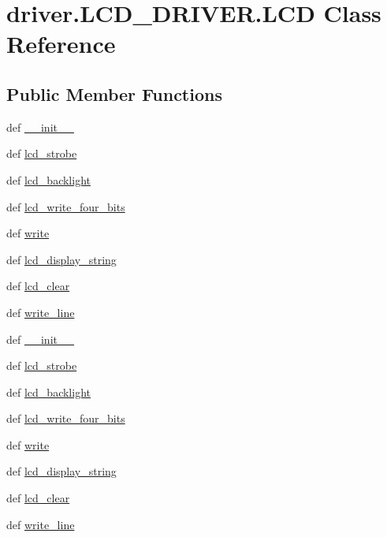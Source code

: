 \hypertarget{classdriver_1_1LCD__DRIVER_1_1LCD}{}\section{driver.\+L\+C\+D\+\_\+\+D\+R\+I\+V\+E\+R.\+L\+C\+D Class Reference}
\label{classdriver_1_1LCD__DRIVER_1_1LCD}
\subsection*{Public Member Functions}
\begin{DoxyCompactItemize}
\item 
def \hyperlink{classdriver_1_1LCD__DRIVER_1_1LCD_a20225b4d0a79ea608ab2788528735b17}{\+\_\+\+\_\+init\+\_\+\+\_\+}
\item 
def \hyperlink{classdriver_1_1LCD__DRIVER_1_1LCD_a15e214b2ce2f4e8e6e4eb46db360eb17}{lcd\+\_\+strobe}
\item 
def \hyperlink{classdriver_1_1LCD__DRIVER_1_1LCD_ac5e728a550c74f93db7aeac717f71f56}{lcd\+\_\+backlight}
\item 
def \hyperlink{classdriver_1_1LCD__DRIVER_1_1LCD_a50b4cd9441fc0869a3fc02823e1c4b50}{lcd\+\_\+write\+\_\+four\+\_\+bits}
\item 
def \hyperlink{classdriver_1_1LCD__DRIVER_1_1LCD_ad163c5a30bf46c9b7e794af4c5ee1580}{write}
\item 
def \hyperlink{classdriver_1_1LCD__DRIVER_1_1LCD_a234077a291a2a5fca1bac4e9cf6c05d0}{lcd\+\_\+display\+\_\+string}
\item 
def \hyperlink{classdriver_1_1LCD__DRIVER_1_1LCD_a6d9ced9d16566a567806e0bc2db053b4}{lcd\+\_\+clear}
\item 
def \hyperlink{classdriver_1_1LCD__DRIVER_1_1LCD_a4b8df3a45944a01d6a12b88f79d0d337}{write\+\_\+line}
\item 
def \hyperlink{classdriver_1_1LCD__DRIVER_1_1LCD_a20225b4d0a79ea608ab2788528735b17}{\+\_\+\+\_\+init\+\_\+\+\_\+}
\item 
def \hyperlink{classdriver_1_1LCD__DRIVER_1_1LCD_a15e214b2ce2f4e8e6e4eb46db360eb17}{lcd\+\_\+strobe}
\item 
def \hyperlink{classdriver_1_1LCD__DRIVER_1_1LCD_ac5e728a550c74f93db7aeac717f71f56}{lcd\+\_\+backlight}
\item 
def \hyperlink{classdriver_1_1LCD__DRIVER_1_1LCD_a50b4cd9441fc0869a3fc02823e1c4b50}{lcd\+\_\+write\+\_\+four\+\_\+bits}
\item 
def \hyperlink{classdriver_1_1LCD__DRIVER_1_1LCD_ad163c5a30bf46c9b7e794af4c5ee1580}{write}
\item 
def \hyperlink{classdriver_1_1LCD__DRIVER_1_1LCD_a234077a291a2a5fca1bac4e9cf6c05d0}{lcd\+\_\+display\+\_\+string}
\item 
def \hyperlink{classdriver_1_1LCD__DRIVER_1_1LCD_a6d9ced9d16566a567806e0bc2db053b4}{lcd\+\_\+clear}
\item 
def \hyperlink{classdriver_1_1LCD__DRIVER_1_1LCD_a4b8df3a45944a01d6a12b88f79d0d337}{write\+\_\+line}
\end{DoxyCompactItemize}
